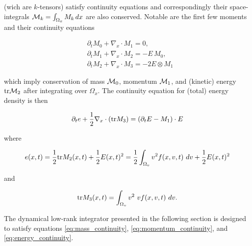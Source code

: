 (wich are $k$-tensors) satisfy continuity equations and correspondingly their 
space-integrals $\mathcal{M}_k = \int_{\Omega_x} M_k\, dx$ are also conserved. Notable are 
the first few moments and their continuity equations

\begin{align}
    &\partial_t M_0 + \nabla_x \cdot M_1 = 0, \label{eq:mass_continuity}\\
    &\partial_t M_1 + \nabla_x \cdot M_2 = - E\, M_0, \label{eq:momentum_continuity}\\
    &\partial_t M_2 + \nabla_x \cdot M_3 = - 2 E \otimes M_1
\end{align}

which imply conservation of mass $\mathcal{M}_0$, momentum $\mathcal{M}_1$, and (kinetic) energy 
$\text{tr} \mathcal{M}_2$ after integrating over $\Omega_x$. The continuity equation for (total) 
energy density is then 

\begin{equation}\label{eq:energy_continuity}
    \partial_t e + \frac{1}{2} \nabla_x \cdot (\text{tr} M_3) = (\partial_t E - M_1) \cdot E
\end{equation}

where 

\begin{equation}
    e(x, t) = \frac{1}{2} \text{tr} M_2 (x, t) + \frac{1}{2} E(x, t)^2
    = \frac{1}{2} \int_{\Omega_v} v^2 f(x, v, t)\ dv + \frac{1}{2} E(x, t)^2  
\end{equation}

and 

\begin{equation}
    \trace M_3 (x, t) = \int_{\Omega_v} v^2\ v f(x, v, t)\ dv . 
\end{equation}

The dynamical low-rank integrator presented in the following section is designed to 
satisfy equations \ref{eq:mass_continuity}, \ref{eq:momentum_continuity}, and 
\ref{eq:energy_continuity}. 


